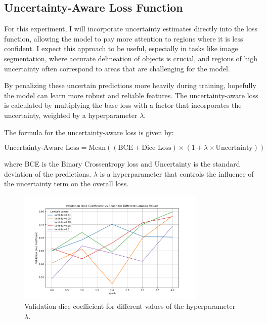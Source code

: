 \documentclass{article}
\begin{document}
\subsection{Uncertainty-Aware Loss Function}

For this experiment, I will incorporate uncertainty estimates directly into the loss function, allowing the model 
to pay more attention to regions where it is less confident. I expect this approach to be useful, especially in tasks like 
image segmentation, where accurate delineation of objects is crucial, and regions of high uncertainty often correspond to 
areas that are challenging for the model.
\vspace{1em}

By penalizing these uncertain predictions more heavily during training, hopefully the model can learn more robust 
and reliable features. The uncertainty-aware loss is calculated by multiplying the base loss with a factor that 
incorporates the uncertainty, weighted by a hyperparameter \(\lambda\).

The formula for the uncertainty-aware loss is given by:

\[
\text{Uncertainty-Aware Loss} = \text{Mean} \left( (\text{BCE} + \text{Dice Loss}) \times (1 + \lambda \times \text{Uncertainty}) \right)
\]

where BCE is the Binary Crossentropy loss and Uncertainty is the standard deviation of the predictions. 
\(\lambda\) is a hyperparameter that controls the influence of the uncertainty term on the overall loss.

\begin{figure}[h]
    \centering
    \includegraphics[width=0.8\textwidth]{../images/uncertainity aware loss funcs/diff_lambvda_values_graph.png}
    \caption{Validation dice coefficient for different values of the hyperparameter \(\lambda\).}
    \label{fig:uncertainty_aware_loss}
\end{figure}
\end{document}
